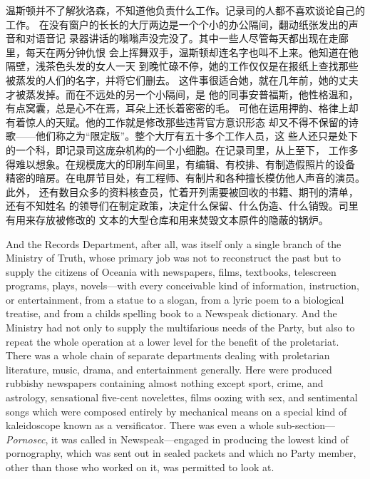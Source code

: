 \begin{paracol}{2}
温斯顿并不了解狄洛森，不知道他负责什么工作。记录司的人都不喜欢谈论自己的工作。
在没有窗户的长长的大厅两边是一个个小的办公隔间，翻动纸张发出的声音和对语音记
录器讲话的嗡嗡声没完没了。其中一些人尽管每天都出现在走廊里，每天在两分钟仇恨
会上挥舞双手，温斯顿却连名字也叫不上来。他知道在他隔壁，浅茶色头发的女人一天
到晚忙碌不停，她的工作仅仅是在报纸上查找那些被蒸发的人们的名字，并将它们删去。
这件事很适合她，就在几年前，她的丈夫才被蒸发掉。而在不远处的另一个小隔间，是
他的同事安普福斯，他性格温和，有点窝囊，总是心不在焉，耳朵上还长着密密的毛。
可他在运用押韵、格律上却有着惊人的天赋。他的工作就是修改那些违背官方意识形态
却又不得不保留的诗歌——他们称之为``限定版''。整个大厅有五十多个工作人员，这
些人还只是处下的一个科，即记录司这庞杂机构的一个小细胞。在记录司里，从上至下，
工作多得难以想象。在规模庞大的印刷车间里，有编辑、有校排、有制造假照片的设备
精密的暗房。在电屏节目处，有工程师、有制片和各种擅长模仿他人声音的演员。此外，
还有数目众多的资料核查员，忙着开列需要被回收的书籍、期刊的清单，还有不知姓名
的领导们在制定政策，决定什么保留、什么伪造、什么销毁。司里有用来存放被修改的
文本的大型仓库和用来焚毁文本原件的隐蔽的锅炉。

\switchcolumn*

And the Records Department, after all, was itself only a single branch
of the Ministry of Truth, whose primary job was not to reconstruct the
past but to supply the citizens of Oceania with newspapers, films,
textbooks, telescreen programs, plays, novels---with every conceivable
kind of information, instruction, or entertainment, from a statue to a
slogan, from a lyric poem to a biological treatise, and from a
child\textquotesingle s spelling book to a Newspeak dictionary. And the
Ministry had not only to supply the multifarious needs of the Party, but
also to repeat the whole operation at a lower level for the benefit of
the proletariat. There was a whole chain of separate departments dealing
with proletarian literature, music, drama, and entertainment generally.
Here were produced rubbishy newspapers containing almost nothing except
sport, crime, and astrology, sensational five-cent novelettes, films
oozing with sex, and sentimental songs which were composed entirely by
mechanical means on a special kind of kaleidoscope known as a
versificator. There was even a whole sub-section---\emph{Pornosec}, it
was called in Newspeak---engaged in producing the lowest kind of
pornography, which was sent out in sealed packets and which no Party
member, other than those who worked on it, was permitted to look at.

\switchcolumn


\end{paracol}
